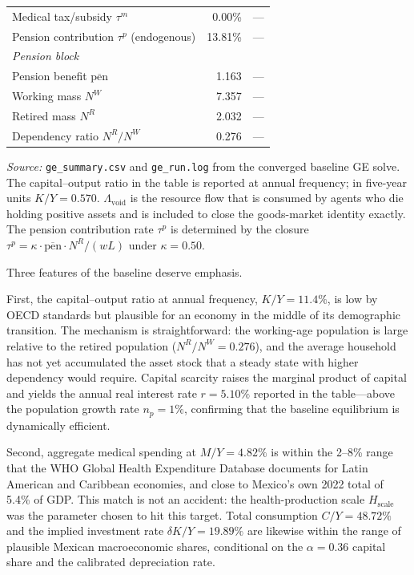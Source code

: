 \documentclass[12pt,a4paper]{article}
\begin{document}
\begin{table}[H]
\begin{tabular}{lrr}
Medical tax/subsidy $\tau^{m}$ & 0.00\% & --- \\
Pension contribution $\tau^{p}$ (endogenous) & 13.81\% & --- \\
\hline
\multicolumn{3}{l}{\textit{Pension block}} \\
Pension benefit $\overline{\text{pen}}$ & 1.163 & --- \\
Working mass $N^{W}$         & 7.357 & --- \\
Retired mass $N^{R}$         & 2.032 & --- \\
Dependency ratio $N^{R}/N^{W}$ & 0.276 & --- \\
\hline\hline
\end{tabular}
\begin{minipage}{\linewidth}
\smallskip
\footnotesize
\textit{Source:} \texttt{ge\_summary.csv} and \texttt{ge\_run.log} from
the converged baseline GE solve. The capital--output ratio in the table
is reported at annual frequency; in five-year units $K/Y = 0.570$.
$\Lambda_{\text{void}}$ is the resource flow that is consumed by agents
who die holding positive assets and is included to close the
goods-market identity exactly. The pension contribution rate
$\tau^{p}$ is determined by the closure
$\tau^{p} = \kappa \cdot \overline{\text{pen}} \cdot N^{R} / (w L)$
under $\kappa = 0.50$.
\end{minipage}
\end{table}

Three features of the baseline deserve emphasis.

First, the capital--output ratio at annual frequency, $K/Y = 11.4\%$,
is low by OECD standards but plausible for an economy in the middle
of its demographic transition. The mechanism is straightforward: the
working-age population is large relative to the retired population
($N^{R}/N^{W} = 0.276$), and the average household has not yet
accumulated the asset stock that a steady state with higher dependency
would require. Capital scarcity raises the marginal product of capital
and yields the annual real interest rate $r = 5.10\%$ reported in the
table---above the population growth rate $n_{p} = 1\%$, confirming
that the baseline equilibrium is dynamically efficient.

Second, aggregate medical spending at $M/Y = 4.82\%$ is within the
2--8\% range that the WHO Global Health Expenditure Database documents
for Latin American and Caribbean economies, and close to Mexico's own
2022 total of 5.4\% of GDP. This match is not an accident: the
health-production scale $H_{\text{scale}}$ was the parameter chosen to
hit this target. Total consumption $C/Y = 48.72\%$ and the implied
investment rate $\delta K / Y = 19.89\%$ are likewise within the range
of plausible Mexican macroeconomic shares, conditional on the
$\alpha = 0.36$ capital share and the calibrated depreciation rate.
\end{document}
